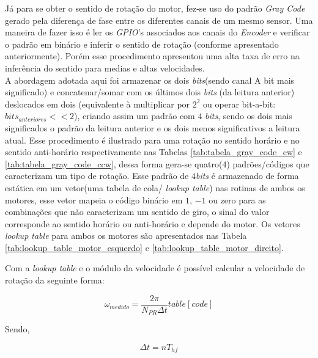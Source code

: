 Já para se obter o sentido de rotação do motor, fez-se uso do padrão \emph{Gray Code} gerado pela diferença de fase entre os diferentes canais de um mesmo sensor. Uma maneira de fazer isso é ler os \emph{GPIO}'s associados aos canais do \emph{Encoder} e verificar o padrão em binário e inferir o sentido de rotação (conforme apresentado anteriormente). Porém esse procedimento apresentou uma alta taxa de erro na inferência do sentido para medias e altas velocidades. \\

A abordagem adotada aqui foi armazenar os dois \emph{bits}(sendo canal A bit mais significado) e concatenar/somar com os últimos dois \emph{bits} (da leitura anterior) deslocados em dois (equivalente à multiplicar por $2^2$ ou operar bit-a-bit: $bits_{anteriores} << 2$), criando assim um padrão com $4$ \emph{bits}, sendo os dois mais significados o padrão da leitura anterior e os dois menos significativos a leitura atual. Esse procedimento é ilustrado para uma rotação no sentido horário e no sentido anti-horário respectivamente nas Tabelas \ref{tab:tabela_gray_code_cw} e \ref{tab:tabela_gray_code_ccw}, dessa forma gera-se quatro($4$) padrões/códigos que caracterizam um tipo de rotação. Esse padrão de $4$\emph{bits} é armazenado de forma estática em um vetor(uma tabela de cola/ \emph{lookup table}) nas rotinas de ambos os motores, esse vetor mapeia o código binário em $1$, $-1$ ou zero para as combinações que não caracterizam um sentido de giro, o sinal do valor corresponde ao sentido horário ou anti-horário e depende do motor. Os vetores \emph{lookup table} para ambos os motores são apresentados  nas Tabela \ref{tab:lookup_table_motor_esquerdo} e \ref{tab:lookup_table_motor_direito}.






Com a \emph{lookup table} e o módulo da velocidade é possível calcular a velocidade de rotação da seguinte forma:

\begin{equation}
    \omega_{medido} = \frac{2\pi}{N_{PR}\Delta{t}}table[code]
\end{equation}

Sendo,

\begin{equation*}
    \Delta{t} = nT_{hf}
\end{equation*}

